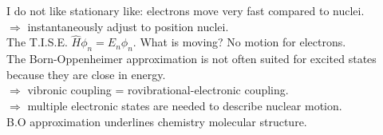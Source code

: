 \documentclass[a4paper, 12pt]{article}
\begin{document}
I do not like stationary like: electrons move very fast compared to nuclei.\\
\indent $\Longrightarrow$ instantaneously adjust to position nuclei.\\
\indent The T.I.S.E. $\hat{H}\phi_n = E_n \phi_n$. What is moving? No motion for electrons.\\

\indent The Born-Oppenheimer approximation is not often suited for excited states because they are close in energy.\\
\indent $\Longrightarrow$ vibronic coupling = rovibrational-electronic coupling.\\
\indent $\Longrightarrow$ multiple electronic states are needed to describe nuclear motion.\\
\indent B.O approximation underlines chemistry molecular structure.
\end{document}
